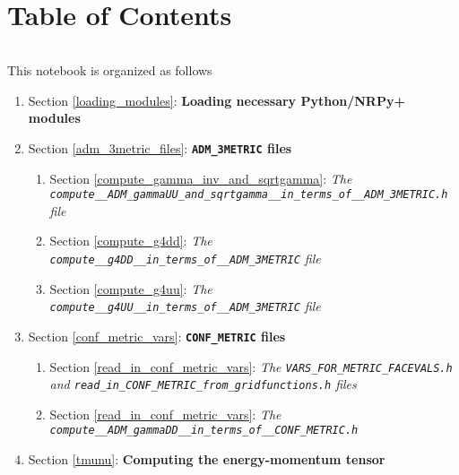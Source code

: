 \documentclass[landscape,letterpaper,10pt,english]{article}
\providecommand{\tightlist}{%
      \setlength{\itemsep}{0pt}\setlength{\parskip}{0pt}}
\begin{document}
    \section{Table of Contents}\label{table-of-contents}

\[\label{toc}\]

This notebook is organized as follows

\begin{enumerate}
\def\labelenumi{\arabic{enumi}.}
\setcounter{enumi}{-1}
\tightlist
\item
  Section \ref{loading_modules}: \textbf{Loading necessary Python/NRPy+
  modules}
\item
  Section \ref{adm_3metric_files}: \textbf{\texttt{ADM\_3METRIC} files}

  \begin{enumerate}
  \def\labelenumii{\arabic{enumii}.}
  \tightlist
  \item
    Section \ref{compute_gamma_inv_and_sqrtgamma}: \emph{The
    \texttt{compute\_\_ADM\_gammaUU\_and\_sqrtgamma\_\_in\_terms\_of\_\_ADM\_3METRIC.h}
    file}
  \item
    Section \ref{compute_g4dd}: \emph{The
    \texttt{compute\_\_g4DD\_\_in\_terms\_of\_\_ADM\_3METRIC} file}
  \item
    Section \ref{compute_g4uu}: \emph{The
    \texttt{compute\_\_g4UU\_\_in\_terms\_of\_\_ADM\_3METRIC} file}
  \end{enumerate}
\item
  Section \ref{conf_metric_vars}: \textbf{\texttt{CONF\_METRIC} files}

  \begin{enumerate}
  \def\labelenumii{\arabic{enumii}.}
  \tightlist
  \item
    Section \ref{read_in_conf_metric_vars}: \emph{The
    \texttt{VARS\_FOR\_METRIC\_FACEVALS.h} and
    \texttt{read\_in\_CONF\_METRIC\_from\_gridfunctions.h} files}
  \item
    Section \ref{read_in_conf_metric_vars}: \emph{The
    \texttt{compute\_\_ADM\_gammaDD\_\_in\_terms\_of\_\_CONF\_METRIC.h}}
  \end{enumerate}
\item
  Section \ref{tmunu}: \textbf{Computing the energy-momentum tensor}


\end{enumerate}
\end{document}
